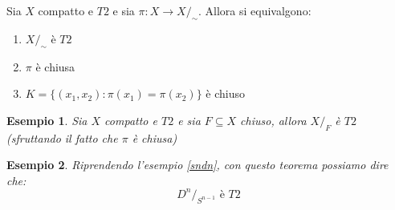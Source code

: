 \documentclass[11pt,a4paper,twoside]{article}
\newtheorem{es}{Esempio}
\theoremstyle{definition}
\begin{document}
\begin{thm}{}{}
	Sia $X$ compatto e $T2$ e sia $\pi: X \to X/_\sim$. Allora si equivalgono:
	\begin{enumerate}
		\item $X/_\sim$ è $T2$
		\item $\pi$ è chiusa
		\item $K = \{(x_1,x_2) : \pi(x_1) = \pi(x_2)\}$ è chiuso
	\end{enumerate}
\end{thm}

\begin{es}
	Sia $X$ compatto e $T2$ e sia $F \subseteq X$ chiuso, allora $X/_F$ è $T2$ (sfruttando il fatto che $\pi$ è chiusa)
\end{es}

\begin{es}
	Riprendendo l'esempio \ref{sndn}, con questo teorema possiamo dire che:
	\[ D^n/_{S^{n-1}}\text{ è }T2 \]
\end{es}
\end{document}
